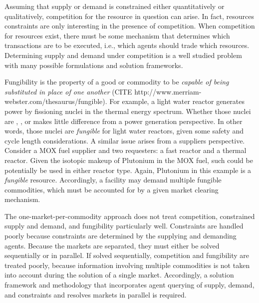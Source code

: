 Assuming that supply or demand is constrained either quantitatively or
qualitatively, competition for the resource in question can arise. In fact,
resources constraints are only interesting in the presence of competition. When
competition for resources exist, there must be some mechanism that determines
which transactions are to be executed, i.e., which agents should trade which
resources. Determining supply and demand under competition is a well studied
problem with many possible formulations and solution frameworks.

Fungibility is the property of a good or commodity to be \textit{capable of
  being substituted in place of one another} (CITE
http://www.merriam-webster.com/thesaurus/fungible). For example, a light water
reactor generates power by fissioning nuclei in the thermal energy
spectrum. Whether those nuclei are , , or
 makes little difference from a power generation perspective. In
other words, those nuclei are \textit{fungible} for light water reactors, given
some safety and cycle length considerations. A similar issue arises from a
suppliers perspective. Consider a MOX fuel supplier and two requesters: a fast
reactor and a thermal reactor. Given the isotopic makeup of Plutonium in the MOX
fuel, such could be potentially be used in either reactor type. Again, Plutonium
in this example is a \textit{fungible} resource. Accordingly, a facility may
demand multiple fungible commodities, which must be accounted for by a given
market clearing mechanism.

The one-market-per-commodity approach does not treat competition, constrained
supply and demand, and fungibility particularly well. Constraints are handled
poorly because constraints are determined by the supplying and demanding
agents. Because the markets are separated, they must either be solved
sequentially or in parallel. If solved sequentially, competition and fungibility
are treated poorly, because information involving multiple commodities is not
taken into account during the solution of a single market. Accordingly, a
solution framework and methodology that incorporates agent querying of supply,
demand, and constraints and resolves markets in parallel is required.

